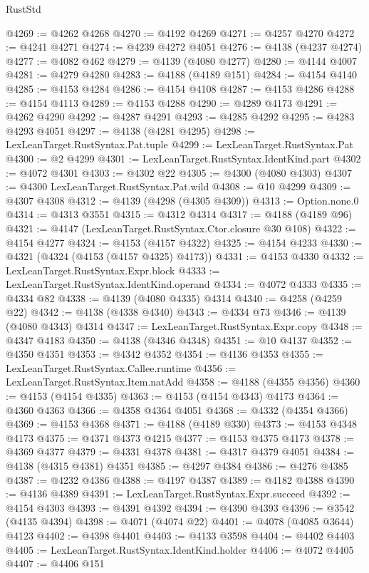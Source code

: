 \begin{lexlean}{RustStd}
\begin{coremodule}
@4269 := @4262 @4268
@4270 := @4192 @4269
@4271 := @4257 @4270
@4272 := @4241 @4271
@4274 := @4239 @4272 @4051
@4276 := @4138 (@4237 @4274)
@4277 := @4082 @462
@4279 := @4139 (@4080 @4277)
@4280 := @4144 @4007
@4281 := @4279 @4280
@4283 := @4188 (@4189 @151)
@4284 := @4154 @4140
@4285 := @4153 @4284
@4286 := @4154 @4108
@4287 := @4153 @4286
@4288 := @4154 @4113
@4289 := @4153 @4288
@4290 := @4289 @4173
@4291 := @4262 @4290
@4292 := @4287 @4291
@4293 := @4285 @4292
@4295 := @4283 @4293 @4051
@4297 := @4138 (@4281 @4295)
@4298 := LexLeanTarget.RustSyntax.Pat.tuple
@4299 := LexLeanTarget.RustSyntax.Pat
@4300 := @2 @4299
@4301 := LexLeanTarget.RustSyntax.IdentKind.part
@4302 := @4072 @4301
@4303 := @4302 @22
@4305 := @4300 (@4080 @4303)
@4307 := @4300 LexLeanTarget.RustSyntax.Pat.wild
@4308 := @10 @4299
@4309 := @4307 @4308
@4312 := @4139 (@4298 (@4305 @4309))
@4313 := Option.none.{0}
@4314 := @4313 @3551
@4315 := @4312 @4314
@4317 := @4188 (@4189 @96)
@4321 := @4147 (LexLeanTarget.RustSyntax.Ctor.closure @30 @108)
@4322 := @4154 @4277
@4324 := @4153 (@4157 @4322)
@4325 := @4154 @4233
@4330 := @4321 (@4324 (@4153 (@4157 @4325) @4173))
@4331 := @4153 @4330
@4332 := LexLeanTarget.RustSyntax.Expr.block
@4333 := LexLeanTarget.RustSyntax.IdentKind.operand
@4334 := @4072 @4333
@4335 := @4334 @82
@4338 := @4139 (@4080 @4335) @4314
@4340 := @4258 (@4259 @22)
@4342 := @4138 (@4338 @4340)
@4343 := @4334 @73
@4346 := @4139 (@4080 @4343) @4314
@4347 := LexLeanTarget.RustSyntax.Expr.copy
@4348 := @4347 @4183
@4350 := @4138 (@4346 @4348)
@4351 := @10 @4137
@4352 := @4350 @4351
@4353 := @4342 @4352
@4354 := @4136 @4353
@4355 := LexLeanTarget.RustSyntax.Callee.runtime
@4356 := LexLeanTarget.RustSyntax.Item.natAdd
@4358 := @4188 (@4355 @4356)
@4360 := @4153 (@4154 @4335)
@4363 := @4153 (@4154 @4343) @4173
@4364 := @4360 @4363
@4366 := @4358 @4364 @4051
@4368 := @4332 (@4354 @4366)
@4369 := @4153 @4368
@4371 := @4188 (@4189 @330)
@4373 := @4153 @4348 @4173
@4375 := @4371 @4373 @4215
@4377 := @4153 @4375 @4173
@4378 := @4369 @4377
@4379 := @4331 @4378
@4381 := @4317 @4379 @4051
@4384 := @4138 (@4315 @4381) @4351
@4385 := @4297 @4384
@4386 := @4276 @4385
@4387 := @4232 @4386
@4388 := @4197 @4387
@4389 := @4182 @4388
@4390 := @4136 @4389
@4391 := LexLeanTarget.RustSyntax.Expr.succeed
@4392 := @4154 @4303
@4393 := @4391 @4392
@4394 := @4390 @4393
@4396 := @3542 (@4135 @4394)
@4398 := @4071 (@4074 @22)
@4401 := @4078 (@4085 @3644) @4123
@4402 := @4398 @4401
@4403 := @4133 @3598
@4404 := @4402 @4403
@4405 := LexLeanTarget.RustSyntax.IdentKind.holder
@4406 := @4072 @4405
@4407 := @4406 @151

\end{coremodule}
\end{lexlean}
